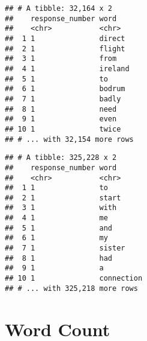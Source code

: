 \documentclass[]{article}
\newenvironment{Shaded}{\begin{snugshade}}{\end{snugshade}}
\newcommand{\KeywordTok}[1]{\textcolor[rgb]{0.13,0.29,0.53}{\textbf{#1}}}
\newcommand{\DataTypeTok}[1]{\textcolor[rgb]{0.13,0.29,0.53}{#1}}
\newcommand{\StringTok}[1]{\textcolor[rgb]{0.31,0.60,0.02}{#1}}
\newcommand{\OtherTok}[1]{\textcolor[rgb]{0.56,0.35,0.01}{#1}}
\newcommand{\ControlFlowTok}[1]{\textcolor[rgb]{0.13,0.29,0.53}{\textbf{#1}}}
\newcommand{\OperatorTok}[1]{\textcolor[rgb]{0.81,0.36,0.00}{\textbf{#1}}}
\newcommand{\NormalTok}[1]{#1}
\begin{document}
\begin{verbatim}
## # A tibble: 32,164 x 2
##    response_number word   
##    <chr>           <chr>  
##  1 1               direct 
##  2 1               flight 
##  3 1               from   
##  4 1               ireland
##  5 1               to     
##  6 1               bodrum 
##  7 1               badly  
##  8 1               need   
##  9 1               even   
## 10 1               twice  
## # ... with 32,154 more rows
\end{verbatim}

\begin{Shaded}
\end{Shaded}

\begin{verbatim}
## # A tibble: 325,228 x 2
##    response_number word      
##    <chr>           <chr>     
##  1 1               to        
##  2 1               start     
##  3 1               with      
##  4 1               me        
##  5 1               and       
##  6 1               my        
##  7 1               sister    
##  8 1               had       
##  9 1               a         
## 10 1               connection
## # ... with 325,218 more rows
\end{verbatim}

\section{Word Count}\label{word-count}

\begin{Shaded}
\end{Shaded}
\end{document}
